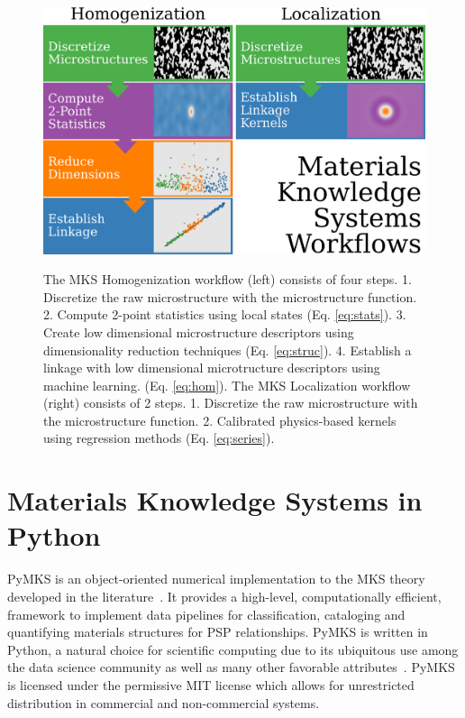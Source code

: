 \documentclass{bmcart}
\begin{document}
\begin{figure}[h!]
  \caption{
     The MKS Homogenization workflow (left) consists of four steps. 1.
     Discretize the raw microstructure with the microstructure function.
     2. Compute 2-point statistics using local states (Eq. \ref{eq:stats}).
     3. Create low dimensional microstructure descriptors using dimensionality
     reduction techniques (Eq. \ref{eq:struc}).
     4. Establish a linkage with low dimensional
     microtructure descriptors using machine learning. (Eq. \ref{eq:hom}).
     The MKS Localization workflow (right) consists of 2 steps.
     1. Discretize the raw microstructure with the microstructure function.
     2. Calibrated physics-based kernels using regression methods (Eq. \ref{eq:series}).}
    \includegraphics[scale=.22]{fig/mks_workflows.png}
  \label{fig:workflows}
\end{figure}


\section{Materials Knowledge Systems in Python}

PyMKS is an object-oriented numerical implementation to the MKS theory
developed in the literature~\cite{kalidindi2010novel}. It provides a
high-level, computationally efficient, framework to implement data
pipelines for classification, cataloging and quantifying materials
structures for PSP relationships. PyMKS is written in Python, a
natural choice for scientific computing due to its ubiquitous use
among the data science community as well as many other favorable
attributes~\cite{perez2011python}. PyMKS is licensed under the
permissive MIT license \cite{MIT} which allows for unrestricted
distribution in commercial and non-commercial systems.
\end{document}
